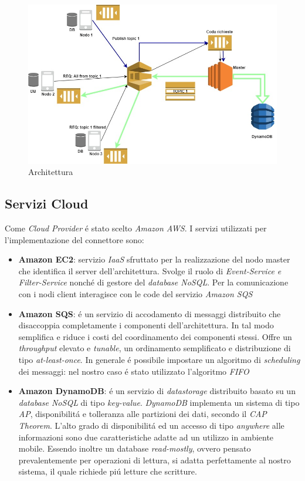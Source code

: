 \documentclass{article}
\begin{document}
\begin{figure}[h]
\begin{center}
\centering
\includegraphics[width=1.25\textwidth]{architettura.jpg} %
\caption{Architettura}
\label{fig:Architettura}
\end{center}
\end{figure}

\subsection{Servizi Cloud}

Come \textit{Cloud Provider} \'e stato scelto \textit{Amazon AWS}. I servizi utilizzati per l'implementazione del connettore sono:

\begin{itemize}
\item{\textbf{Amazon EC2}: servizio \textit{IaaS} sfruttato per la realizzazione del nodo master che identifica il server dell'architettura. Svolge il ruolo di \textit{Event-Service e Filter-Service} nonch\'e di gestore del \textit{database NoSQL}. Per la comunicazione con i nodi client interagisce con le code del servizio \textit{Amazon SQS}}
\item{\textbf{Amazon SQS}: \'e un servizio di accodamento di messaggi distribuito che disaccoppia completamente i componenti dell'architettura. In tal modo semplifica e riduce i costi del coordinamento dei componenti stessi. Offre un \textit{throughput} elevato e \textit{tunable}, un ordinamento semplificato e distribuzione di tipo \textit{at-least-once}. In generale \'e possibile impostare un algoritmo di \textit{scheduling} dei messaggi: nel nostro caso \'e stato utilizzato l'algoritmo \textit{FIFO}}
\item{\textbf{Amazon DynamoDB}: \'e un servizio di \textit{datastorage} distribuito basato su un \textit{database NoSQL} di tipo \textit{key-value}. \textit{DynamoDB} implementa un sistema di tipo \textit{AP}, disponibilit\'a e tolleranza alle partizioni dei dati, secondo il \textit{CAP Theorem}. L'alto grado di disponibilit\'a ed un accesso di tipo \textit{anywhere} alle informazioni sono due caratteristiche adatte ad un utilizzo in ambiente mobile. Essendo inoltre un database \textit{read-mostly}, ovvero pensato prevalentemente per operazioni di lettura, si adatta perfettamente al nostro sistema, il quale richiede pi\'u letture che scritture.}
\end{itemize}
\end{document}
